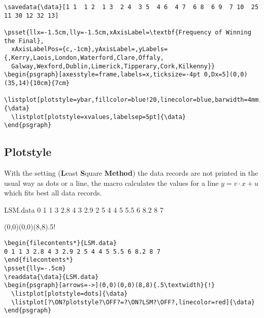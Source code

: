 \documentclass[11pt,english,BCOR10mm,DIV12,bibliography=totoc,parskip=false,smallheadings
    headexclude,footexclude,oneside,dvipsnames,svgnames]{pst-doc}
\begin{document}
\begin{lstlisting}
\savedata{\data}[1 1  1 2  1 3  2 4  3 5  4 6  4 7  6 8  6 9  7 10  25 11 30 12 32 13]

\psset{llx=-1.5cm,lly=-1.5cm,xAxisLabel=\textbf{Frequency of Winning the Final},
  xAxisLabelPos={c,-1cm},yAxisLabel=,yLabels={,Kerry,Laois,London,Waterford,Clare,Offaly,
  Galway,Wexford,Dublin,Limerick,Tipperary,Cork,Kilkenny}}
\begin{psgraph}[axesstyle=frame,labels=x,ticksize=-4pt 0,Dx=5](0,0)(35,14){10cm}{7cm}
  \listplot[plotstyle=ybar,fillcolor=blue!20,linecolor=blue,barwidth=4mm,fillstyle=solid]{\data}
  \listplot[plotstyle=xvalues,labelsep=5pt]{\data}
\end{psgraph}
\end{lstlisting}

\subsection{Plotstyle }\label{LSM}
With the setting  (\textbf{L}east \textbf{S}quare \textbf{Method})
the data records are not printed in the usual way as dots or a line,
the  macro calculates the values for a line $y=v\cdot x+u$ which fits
best all data records.

\bgroup
\centering
\begin{filecontents*}{LSM.data}
0 1 1 3 2.8 4 3 2.9 2 5 4 4 5 5.5 6 8.2 8 7
\end{filecontents*}
\begin{psgraph}[arrows=->](0,0)(0,0)(8,8){.5\textwidth}{!}
  \listplot[plotstyle=dots]{\data}
  \listplot[plotstyle=LSM,linecolor=red]{\data}
\end{psgraph}
\egroup


\begin{lstlisting}
\begin{filecontents*}{LSM.data}
0 1 1 3 2.8 4 3 2.9 2 5 4 4 5 5.5 6 8.2 8 7
\end{filecontents*}
\psset{lly=-.5cm}
\readdata{\data}{LSM.data}
\begin{psgraph}[arrows=->](0,0)(0,0)(8,8){.5\textwidth}{!}
  \listplot[plotstyle=dots]{\data}
  \listplot[?\ON?plotstyle?\OFF?=?\ON?LSM?\OFF?,linecolor=red]{\data}
\end{psgraph}
\end{lstlisting}
\end{document}

